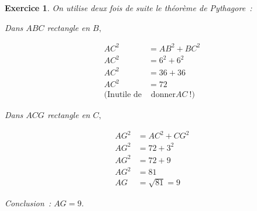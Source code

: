 \documentclass[10pt]{article}
\newtheorem{exo}{Exercice}
\begin{document}
\begin{exo}
On utilise deux fois de suite le théorème de Pythagore~:

\setlength{\columnseprule}{1pt}
\begin{multicols}{2}
 Dans $ABC$ rectangle en $B,$
 
 \begin{align*}
AC^2&=AB^2+BC^2\\
AC^2&=6^2+6^2\\
AC^2&=36+36\\
AC^2&=72\\
(\text{Inutile de} & \text{ donner} AC~!)
\end{align*}

\columnbreak

 Dans $ACG$ rectangle en $C,$
 
 \begin{align*}
AG^2&=AC^2+CG^2\\
AG^2&=72+3^2\\
AG^2&=72+9\\
AG^2&=81\\
AG&=\sqrt{81}=9
\end{align*}

\end{multicols}




Conclusion~: $AG=9.$

\end{exo}
\end{document}
